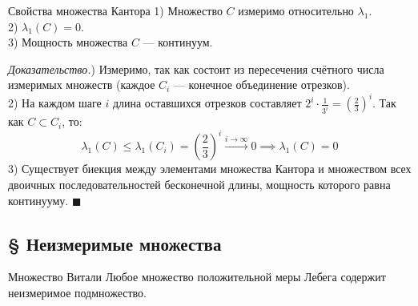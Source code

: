 \documentclass[12pt,a4paper]{article}
\newenvironment{Proof}[1][Доказательство]{\vspace{0.5em}\noindent\textit{#1.}\hspace{0.5em}\ignorespaces}{\hfill$\blacksquare$\vspace{1em}}
\begin{document}
\begin{Lemma}{Свойства множества Кантора}{}
1) Множество $C$ измеримо относительно $\lambda_1$. \\
2) $\lambda_1(C) = 0$. \\
3) Мощность множества $C$ — континуум.
\end{Lemma}

\begin{Proof}
1) Измеримо, так как состоит из пересечения счётного числа измеримых множеств (каждое $C_i$ — конечное объединение отрезков). \\
2) На каждом шаге $i$ длина оставшихся отрезков составляет $2^i \cdot \frac{1}{3^i} = \left(\frac{2}{3}\right)^i$. Так как $C \subset C_i$, то:
$$ \lambda_1(C) \le \lambda_1(C_i) = \left(\frac{2}{3}\right)^i \xrightarrow{i \to \infty} 0 \implies \lambda_1(C) = 0 $$
3) Существует биекция между элементами множества Кантора и множеством всех двоичных последовательностей бесконечной длины, мощность которого равна континууму.
\end{Proof}

\subsection{§ Неизмеримые множества}

\begin{Theorem}{Множество Витали}{}
Любое множество положительной меры Лебега содержит неизмеримое подмножество.
\end{Theorem}
\end{document}
